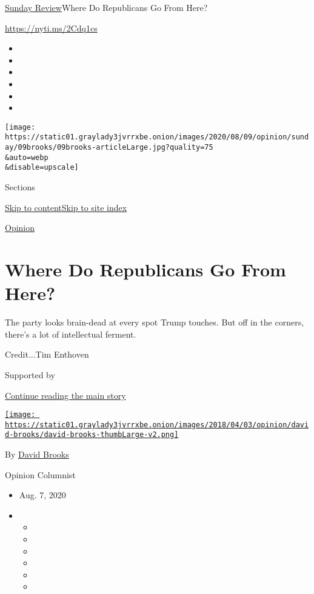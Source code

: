 \href{/section/opinion/sunday}{Sunday Review}\textbar{}Where Do
Republicans Go From Here?

\url{https://nyti.ms/2Cdq1cs}

\begin{itemize}
\item
\item
\item
\item
\item
\item
\end{itemize}

\texttt{[image: https://static01.graylady3jvrrxbe.onion/images/2020/08/09/opinion/sunday/09brooks/09brooks-articleLarge.jpg?quality=75\\\&auto=webp\\\&disable=upscale]}

Sections

\protect\hyperlink{site-content}{Skip to
content}\protect\hyperlink{site-index}{Skip to site index}

\href{/section/opinion}{Opinion}

\hypertarget{where-do-republicans-go-from-here}{%
\section{Where Do Republicans Go From
Here?}\label{where-do-republicans-go-from-here}}

The party looks brain-dead at every spot Trump touches. But off in the
corners, there's a lot of intellectual ferment.

Credit...Tim Enthoven

Supported by

\protect\hyperlink{after-sponsor}{Continue reading the main story}

\href{https://www.nytimes3xbfgragh.onion/by/david-brooks}{\texttt{[image: https://static01.graylady3jvrrxbe.onion/images/2018/04/03/opinion/david-brooks/david-brooks-thumbLarge-v2.png]}}

By \href{https://www.nytimes3xbfgragh.onion/by/david-brooks}{David
Brooks}

Opinion Columnist

\begin{itemize}
\item
  Aug. 7, 2020
\item
  \begin{itemize}
  \item
  \item
  \item
  \item
  \item
  \item
  \end{itemize}
\end{itemize}

